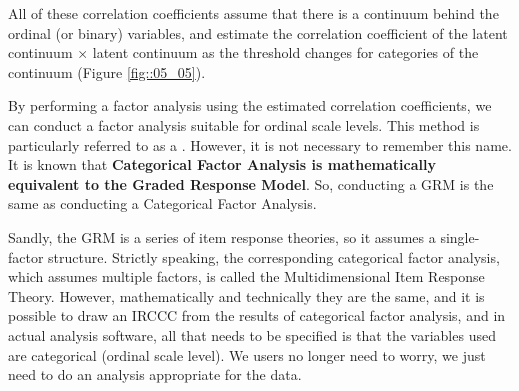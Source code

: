 \documentclass{ltjsbook}
\begin{document}
All of these correlation coefficients assume that there is a continuum behind the ordinal (or binary) variables, and estimate the correlation coefficient of the latent continuum × latent continuum as the threshold changes for categories of the continuum (Figure \ref{fig::05_05}).


By performing a factor analysis using the estimated correlation coefficients, we can conduct a factor analysis suitable for ordinal scale levels. This method is particularly referred to as a . However, it is not necessary to remember this name. It is known that \textbf{Categorical Factor Analysis is mathematically equivalent to the Graded Response Model}. So, conducting a GRM is the same as conducting a Categorical Factor Analysis.

Sandly, the GRM is a series of item response theories, so it assumes a single-factor structure. Strictly speaking, the corresponding categorical factor analysis, which assumes multiple factors, is called the Multidimensional Item Response Theory. However, mathematically and technically they are the same, and it is possible to draw an IRCCC from the results of categorical factor analysis, and in actual analysis software, all that needs to be specified is that the variables used are categorical (ordinal scale level). We users no longer need to worry, we just need to do an analysis appropriate for the data.
\end{document}
